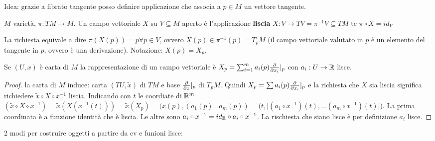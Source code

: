 Idea: grazie a fibrato tangente posso definire applicazione che
associa a $p\in M$ un vettore tangente.
\begin{definition}
    $M$ varietà, $\pi:TM\to M$. Un campo vettoriale $X$ su
    $V\subseteq M$ aperto è l'applicazione \textbf{liscia} $X:V\to
    TV=\pi^{-1}V\subseteq TM$ tc $\pi\circ X=id_V$
\end{definition}
La richiesta equivale a dire $\pi(X(p))=p\forall p\in V$, ovvero
$X(p)\in\pi^{-1}(p)=T_pM$ (il campo vettoriale valutato in $p$ è
un elemento del tangente in $p$, ovvero è una derivazione).
Notazione: $X(p)=X_p$.


\begin{theorem}
    Se $(U,x)$ è carta di $M$ la rappresentazione di un campo
    vettoriale è $X_p=\sum_{i=1}^m a_i(p)\pdv{x_i}|_p$ con
    $a_i:U\to\mathbb{R}$ lisce.
\end{theorem}
\begin{proof}
    la carta di $M$ induce: carta $(TU,\tilde{x})$ di $TM$ e 
    base $\pdv{x}|_p$ di $T_pM$. Quindi $X_p=\sum
    a_i(p)\pdv{x_i}|_p$ e la richiesta che $X$ sia liscia significa
    richiedere $\tilde{x}\circ X\circ x^{-1}$ liscia. Indicando con
    $t$ le coordiate di $\mathbb{R}^m$
    $(\tilde{x}\circ X\circ
    x^{-1})=\tilde{x}(X(x^{-1}(t)))=\tilde{x}(X_p)=
    (x(p),(a_1(p)\dots a_m(p))=\bigl(t,\bigl[(a_1\circ
    x^{-1})(t),\dots(a_m\circ x^{-1})(t)\bigr]\bigr)$. La prima
    coordinata è a funzione identità che è liscia. Le altre sono
    $a_i\circ x^{-1}=id_{\mathbb{R}}\circ a_i\circ x^{-1}$. La rischiesta che
    siano lisce è per definizione $a_i$ lisce.
    
\end{proof}
2 modi per costruire oggetti a partire da cv e funioni lisce:

